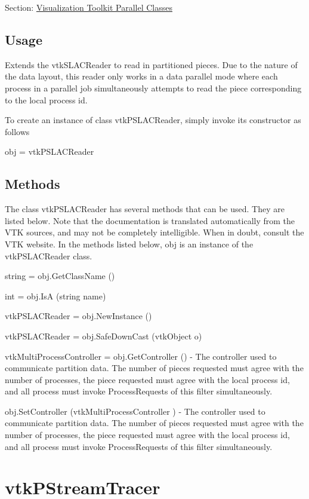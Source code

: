 Section\-: \hyperlink{sec_vtkparallel}{Visualization Toolkit Parallel Classes} \hypertarget{vtkwidgets_vtkxyplotwidget_Usage}{}\subsection{Usage}\label{vtkwidgets_vtkxyplotwidget_Usage}
Extends the vtk\-S\-L\-A\-C\-Reader to read in partitioned pieces. Due to the nature of the data layout, this reader only works in a data parallel mode where each process in a parallel job simultaneously attempts to read the piece corresponding to the local process id.

To create an instance of class vtk\-P\-S\-L\-A\-C\-Reader, simply invoke its constructor as follows \begin{DoxyVerb}  obj = vtkPSLACReader
\end{DoxyVerb}
 \hypertarget{vtkwidgets_vtkxyplotwidget_Methods}{}\subsection{Methods}\label{vtkwidgets_vtkxyplotwidget_Methods}
The class vtk\-P\-S\-L\-A\-C\-Reader has several methods that can be used. They are listed below. Note that the documentation is translated automatically from the V\-T\-K sources, and may not be completely intelligible. When in doubt, consult the V\-T\-K website. In the methods listed below, {\ttfamily obj} is an instance of the vtk\-P\-S\-L\-A\-C\-Reader class. 
\begin{DoxyItemize}
\item {\ttfamily string = obj.\-Get\-Class\-Name ()}  
\item {\ttfamily int = obj.\-Is\-A (string name)}  
\item {\ttfamily vtk\-P\-S\-L\-A\-C\-Reader = obj.\-New\-Instance ()}  
\item {\ttfamily vtk\-P\-S\-L\-A\-C\-Reader = obj.\-Safe\-Down\-Cast (vtk\-Object o)}  
\item {\ttfamily vtk\-Multi\-Process\-Controller = obj.\-Get\-Controller ()} -\/ The controller used to communicate partition data. The number of pieces requested must agree with the number of processes, the piece requested must agree with the local process id, and all process must invoke Process\-Requests of this filter simultaneously.  
\item {\ttfamily obj.\-Set\-Controller (vtk\-Multi\-Process\-Controller )} -\/ The controller used to communicate partition data. The number of pieces requested must agree with the number of processes, the piece requested must agree with the local process id, and all process must invoke Process\-Requests of this filter simultaneously.  
\end{DoxyItemize}\hypertarget{vtkparallel_vtkpstreamtracer}{}\section{vtk\-P\-Stream\-Tracer}\label{vtkparallel_vtkpstreamtracer}
